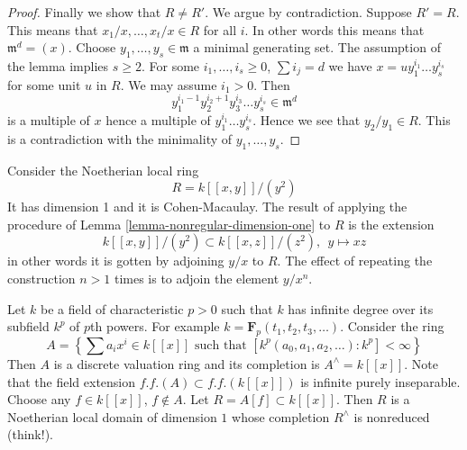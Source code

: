 \begin{proof}
\medskip\noindent
Finally we show that $R \not = R'$.
We argue by contradiction. Suppose $R' = R$. This means that
$x_1/x, \ldots, x_t/x \in R$ for all $i$. In other words this means
that $\mathfrak m^d = (x)$.
Choose $y_1, \ldots, y_s \in \mathfrak m$ a minimal generating set.
The assumption of the lemma implies $s \geq 2$.
For some $i_1, \ldots, i_s \geq 0$, $\sum i_j = d$ we have
$x = u y_1^{i_1} \ldots y_s^{i_s}$ for some unit $u$ in $R$.
We may assume $i_1 > 0$. Then
$$
y_1^{i_1 - 1} y_2^{i_2 + 1} y_3^{i_3} \ldots y_s^{i_s} \in \mathfrak m^d
$$
is a multiple of $x$ hence a multiple of $y_1^{i_1} \ldots y_s^{i_s}$.
Hence we see that $y_2/y_1 \in R$. This is a contradiction with
the minimality of $y_1, \ldots, y_s$.
\end{proof}

\begin{example}
\label{example-nonreduced}
Consider the Noetherian local ring
$$
R = k[[x, y]]/(y^2)
$$
It has dimension 1 and it is Cohen-Macaulay.
The result of applying the procedure of
Lemma \ref{lemma-nonregular-dimension-one} to $R$
is the extension
$$
k[[x, y]]/(y^2) \subset k[[x, z]]/(z^2), \ \ y \mapsto xz
$$
in other words it is gotten by adjoining $y/x$ to $R$. The
effect of repeating the construction $n > 1$ times is
to adjoin the element $y/x^n$.
\end{example}

\begin{example}
\label{example-bad-dvr-char-p}
Let $k$ be a field of characteristic $p > 0$ such that $k$
has infinite degree over its subfield $k^p$ of $p$th powers.
For example $k = \mathbf{F}_p(t_1, t_2, t_3, \ldots)$.
Consider the ring
$$
A =
\left\{
\sum a_i x^i \in k[[x]] \text{ such that }
[k^p(a_0, a_1, a_2, \ldots) : k^p] < \infty
\right\}
$$
Then $A$ is a discrete valuation ring and its completion is
$A^\wedge = k[[x]]$. Note that the field extension $f.f.(A) \subset
f.f.(k[[x]])$ is infinite purely inseparable.
Choose any $f \in k[[x]]$, $f \not \in A$. Let $R = A[f] \subset k[[x]]$.
Then $R$ is a Noetherian local domain of dimension $1$ whose
completion $R^\wedge$ is nonreduced (think!).
\end{example}


